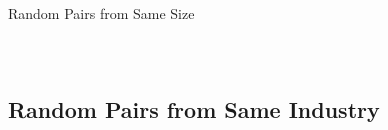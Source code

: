 \documentclass{beamer}
\begin{document}
\begin{frame}{Random Pairs from Same Size}
\begin{columns}
\begin{figure}
			\end{figure}
%			
			
		\end{columns}
	\end{frame}
	
	
	\subsection{Random Pairs from Same Industry}
	
\end{document}
